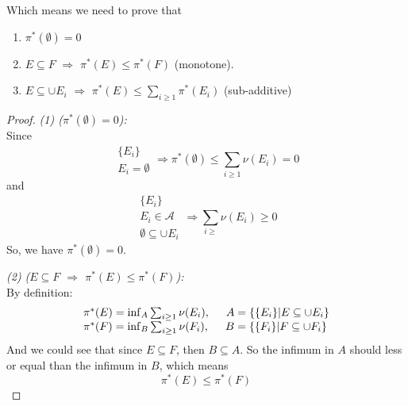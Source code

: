 \begin{lemma}
  Which means we need to prove that
  \begin{enumerate}
  \item $\pi^*(\emptyset) = 0$
  \item $E\subseteq F$ $\Rightarrow$ $\pi^*(E)\leq\pi^*(F)$ (monotone).
  \item $E\subseteq \cup E_i$ $\Rightarrow$ $\pi^*(E)\leq \sum_{i\geq 1} \pi^*(E_i)$ (sub-additive)
  \end{enumerate}
\end{lemma}
\begin{proof}
  \emph{(1) ($\pi^*(\emptyset) = 0$):} \\
  Since \[
    \substack{\{E_i\} \\ E_i = \emptyset} \Rightarrow
    \pi^*(\emptyset) \leq \sum_{i\geq 1} \nu(E_i) = 0
  \]
  and \[
    \substack{\{E_i\} \\ E_i\in\mathcal{A} \\ \emptyset\subseteq \cup E_i}
    \Rightarrow \sum_{i\geq} \nu(E_i) \geq 0
  \]
  So, we have $\pi^*(\emptyset) = 0$.

  \emph{(2) ($E\subseteq F$ $\Rightarrow$ $\pi^*(E)\leq\pi^*(F)$):} \\
  By definition:
  \[
    \begin{array}{l}
      \pi^*(E) = \inf_A \sum_{i\geq 1} \nu(E_i),\hspace{0.5cm}\mbox{$A = \{\{E_i\}|E \subseteq \cup E_i\}$} \\
      \pi^*(F) = \inf_B \sum_{i\geq 1} \nu(F_i),\hspace{0.5cm}\mbox{$B = \{\{F_i\}|F\subseteq \cup F_i\}$}
    \end{array}
  \]
  And we could see that since $E\subseteq F$, then $B\subseteq A$.
  So the infimum in $A$ should less or equal than the infimum in $B$, which means
  \[\pi^*(E) \leq \pi^*(F)\]


\end{proof}

